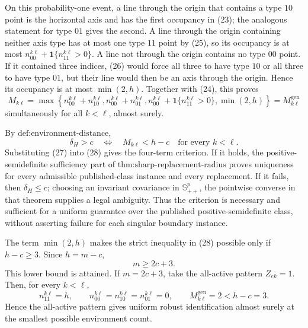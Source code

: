 On this probability-one event, a line through the origin that contains a type \(10\) point is the horizontal axis and has the first occupancy in (23); the analogous statement for type \(01\) gives the second.  A line through the origin containing neither axis type has at most one type \(11\) point by (25), so its occupancy is at most \(n_{00}^{k\ell}+\mathbf 1\{n_{11}^{k\ell}>0\}\).  A line not through the origin contains no type \(00\) point.  If it contained three indices, (26) would force all three to have type \(10\) or all three to have type \(01\), but their line would then be an axis through the origin.  Hence its occupancy is at most \(\min(2,h)\).  Together with (24), this proves
\[
 M_{k\ell}
 =\max\!\left\{
 n_{00}^{k\ell}+n_{10}^{k\ell},
 n_{00}^{k\ell}+n_{01}^{k\ell},
 n_{00}^{k\ell}+\mathbf 1\{n_{11}^{k\ell}>0\},
 \min(2,h)
 \right\}
 =M_{k\ell}^{\mathrm{gen}} \tag{27}
\]
simultaneously for all \(k<\ell\), almost surely.

By \(\text{def:environment-distance}\),
\[
 \delta_H>c
 \quad\Longleftrightarrow\quad
 M_{k\ell}<h-c\quad\text{for every }k<\ell. \tag{28}
\]
Substituting (27) into (28) gives the four-term criterion.  If it holds, the positive-semidefinite sufficiency part of \(\text{thm:sharp-replacement-radius}\) proves uniqueness for every admissible published-class instance and every replacement.  If it fails, then \(\delta_H\le c\); choosing an invariant covariance in \(\mathbb S_{++}^p\), the pointwise converse in that theorem supplies a legal ambiguity.  Thus the criterion is necessary and sufficient for a uniform guarantee over the published positive-semidefinite class, without asserting failure for each singular boundary instance.

The term \(\min(2,h)\) makes the strict inequality in (28) possible only if \(h-c\ge3\).  Since \(h=m-c\),
\[
 m\ge2c+3. \tag{29}
\]
This lower bound is attained.  If \(m=2c+3\), take the all-active pattern \(Z_{ek}=1\).  Then, for every \(k<\ell\),
\[
 n_{11}^{k\ell}=h,\qquad
 n_{00}^{k\ell}=n_{10}^{k\ell}=n_{01}^{k\ell}=0,\qquad
 M_{k\ell}^{\mathrm{gen}}=2<h-c=3. \tag{30}
\]
Hence the all-active pattern gives uniform robust identification almost surely at the smallest possible environment count.